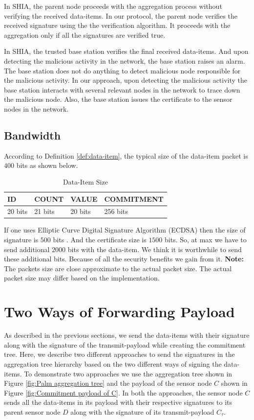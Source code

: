 	In SHIA, the parent node proceeds with the aggregation process without verifying the received data-items.
	In our protocol, the parent node verifies the received signature using the the verification algorithm.
	It proceeds with the aggregation only if all the signatures are verified true.

	In SHIA, the trusted base station verifies the final received data-items.
	And upon detecting the malicious activity in the network, the base station raises an alarm. 
	The base station does not do anything to detect malicious node responsible for the malicious activity.
	In our approach, upon detecting the malicious activity the base station interacts with several relevant nodes in the network to trace down the malicious node.
	Also, the base station issues the certificate to the sensor nodes in the network.
	
	\subsection{Bandwidth}
	
	According to Definition \ref{def:data-item}, the typical size of the data-item packet is $400$ bits as shown below.
	\begin{table}[!htb]	
  		\caption{Data-Item Size}
  		\centering
		\begin{tabular}{ | l | l | l | l |}
			\hline
			ID & COUNT & VALUE & COMMITMENT \\
			\hline
			20 bits & 21 bits & 20 bits & 256 bits\\
			\hline
		\end{tabular}
  	\end{table}
	If one uses Elliptic Curve Digital Signature Algorithm (ECDSA) then the size of signature is $500$ bits \cite{ecdsa2009186}.
	And the certificate size is $1500$ bits.
	So, at max we have to send additional $2000$ bits with the data-item.
	We think it is worthwhile to send these additional bits.
	Because of all the security benefits we gain from it. 
	\textbf{Note:} The packets size are close approximate to the actual packet size. 
	The actual packet size may differ based on the implementation.

\section{Two Ways of Forwarding Payload}	
	
	As described in the previous sections, we send the data-items with their signature along with the signature of the transmit-payload while creating the commitment tree.
	Here, we describe two different approaches to send the signatures in the aggregation tree hierarchy based on the two different ways of signing the data-items.
	To demonstrate two approaches we use the aggregation tree shown in Figure \ref{fig:Palm aggregation tree} and the payload of the sensor node $C$ shown in Figure \ref{fig:Commitment payload of C}.
	In both the approaches, the sensor node $C$ sends all the data-items in its payload with their respective signatures to its parent sensor node $D$ along with the signature of its transmit-payload $C_{\tau}$.

